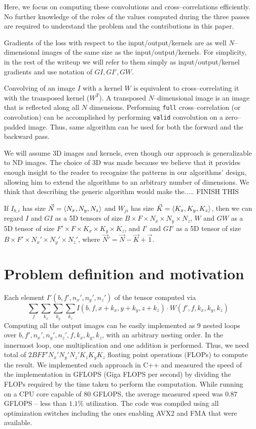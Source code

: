   Here, we focus on computing these convolutions and
  cross--correlations efficiently.  No further knowledge of the roles
  of the values computed during the three passes are required to
  understand the problem and the contributions in this paper.

  Gradients of the loss with respect to the input/output/kernels are
  as well $N$--dimensional images of the same size as the
  input/output/kernels.  For simplicity, in the rest of the writeup we
  will refer to them simply as input/output/kernel gradients and use
  notation of $GI, GI', GW$.

  Convolving of an image $I$ with a kernel $W$ is equivalent to
  cross--correlating it with the transposed kernel ($W^T$).  A
  transposed $N$--dimensional image is an image that is reflected
  along all $N$ dimensions.  Performing \texttt{full}
  cross--correlation (or convolution) can be accomplished by
  performing \texttt{valid} convolution on a zero--padded image.
  Thus, same algorithm can be used for both the forward and the
  backward pass.

  We will assume 3D images and kernels, even though our approach is
  generalizable to ND images.  The choice of 3D was made because we
  believe that it provides enough insight to the reader to recognize
  the patterns in our algorithms' design, allowing him to extend the
  algorithms to an arbitrary number of dimensions.  We think that
  describing the generic algorithm would make the..... FINISH THIS


  If $I_{b,i}$ has size $\vec{N} = \langle N_x, N_y, N_z\rangle$ and
  $W_{ji}$ has size $\vec{K} = \langle K_x,K_y,K_z\rangle$, then we can
  regard $I$ and $GI$ as a 5D tensors of size $B \times F \times N_x
  \times N_y \times N_z$, $W$ and $GW$ as a 5D tensor of size $F'
  \times F \times K_x \times K_y \times K_z$, and $I'$ and $GI'$ as a
  5D tensor of size $B \times F' \times N_x' \times N_y' \times N_z'$,
  where $\vec{N}' = \vec{N} - \vec{K} + \vec{1}$.

\section{Problem definition and motivation}

  Each element $I'(b,f',n_x',n_y',n_z')$ of the tensor computed via
  {\footnotesize
  \[
  \sum_{f} \sum_{k_x} \sum_{k_y} \sum_{k_z}
  I(b,f,x+k_x,y+k_y,z+k_z) \cdot W(f',f,k_x,k_y,k_z)
  \]
  } Computing all the output images can be easily implemented as 9
  nested loops over $b,f',n_x',n_y',n_z',f,k_x,k_y,k_z$, with an
  arbitrary nesting order.  In the innermost loop, one multiplication
  and one addition is performed.  Thus, we need total of
  $2BFF'N_x'N_y'N_z'K_zK_yK_z$ floating point operations (FLOPs) to
  compute the result.  We implemented such approach in C++ and
  measured the speed of the implementation in GFLOPS (Giga FLOPS per
  second) by dividing the FLOPs required by the time taken to perform
  the computation.  While running on a CPU core capable of $80$
  GFLOPS, the average measured speed was $0.87$ GFLOPS -- less than
  $1.1\%$ utilization.  The code was compiled using all optimization
  switches including the ones enabling AVX2 and FMA that were
  available.

